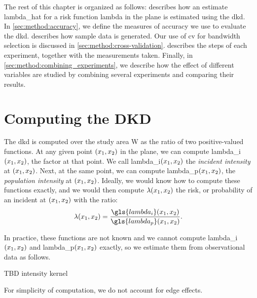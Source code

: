 The rest of this chapter is organized as follows:
 describes how an estimate \gls{lambda_hat} for a risk function \gls{lambda} in the plane is estimated using the \gls{dkd}.
In \cref{sec:method:accuracy}, we define the measures of accuracy we use to evaluate the \gls{dkd}.
 describes how sample data is generated.
Our use of \gls{cv} for bandwidth selection is discussed in  \cref{sec:method:cross-validation}.
 describes the steps of each experiment, together with the measurements taken.
Finally, in \cref{sec:method:combining_experiments}, we describe how the effect of different variables are studied by combining several experiments and comparing their results.

\section{Computing the DKD}
\label{sec:method:computing}

The \gls{dkd} is computed over the study area \gls{W} as the ratio of two positive-valued functions.
At any given point $(x_1, x_2)$ in the plane, we can compute \gls{lambda_i}$(x_1, x_2)$, the \gls{factor} at that point.
We call \gls{lambda_i}$(x_1, x_2)$ the \textit{incident intensity} at $(x_1, x_2)$.
Next, at the same point, we can compute \gls{lambda_p}$(x_1, x_2)$, the \textit{population intensity} at $(x_1, x_2)$.
Ideally, we would know how to compute these functions exactly, and we would then compute $\lambda(x_1, x_2)$ the risk,
or probability of an incident at $(x_1, x_2)$ with the ratio:
\begin{equation}
    \lambda\xvec = \frac{\gls{lambda_i}\xvec}{\gls{lambda_p}\xvec}.
\end{equation}

In practice, these functions are not known and we cannot compute \gls{lambda_i}$(x_1, x_2)$ and \gls{lambda_p}$(x_1, x_2)$ exactly, 
so we estimate them from observational data as follows.

TBD intensity kernel

For simplicity of computation, we do not account for edge effects.


